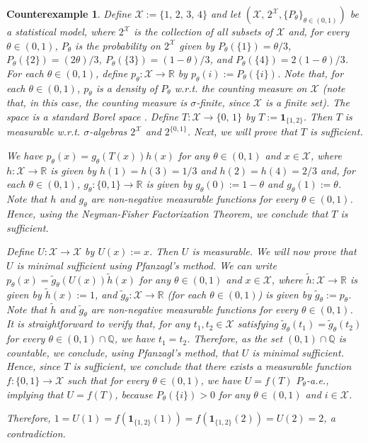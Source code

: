 \documentclass[12pt]{article}
\newtheorem{counterexample}{Counterexample}[section]
\begin{document}
\begin{counterexample}
\label{ex:3.2}
Define $\mathcal{X}:=\{1,\,2,\,3,\,4\}$ and let $(\mathcal{X},\,2^\mathcal{X},\{P_\theta\}_{\theta\in (0,1)})$ be a statistical model, where $2^\mathcal{X}$ is the collection of all subsets of $\mathcal{X}$ and, for every $\theta\in(0,1)$, $P_\theta$ is the probability on $2^\mathcal{X}$ given by $P_\theta (\{1\})=\theta /3$, $P_\theta (\{2\})=(2\theta )/3$, $P_\theta (\{3\})=(1-\theta )/3$, and $P_\theta (\{4\})=2(1-\theta )/3$. For each $\theta\in(0,1)$, define $p_\theta:\mathcal{X}\to \mathbb{R}$ by $p_\theta (i):=P_\theta (\{i\})$. Note that, for each $\theta\in(0,1)$, $p_\theta$ is a density of $P_\theta$ w.r.t. the counting measure on $\mathcal{X}$ (note that, in this case, the counting measure is $\sigma$-finite, since $\mathcal{X}$ is a finite set). The space is a standard Borel space \citep[see the first example of Section 2.2 of][]{Srivastava1998}. Define $T:\mathcal{X}\to \{0,\,1\}$ by $T:=\mathbf{1}_{\{1,2\}}$. Then $T$ is measurable w.r.t. $\sigma$-algebras $2^\mathcal{X}$ and $2^{\{0,1\}}$. Next, we will prove that $T$ is sufficient.

We have $p_\theta (x)=g_{\theta}(T(x))h(x)$ for any $\theta\in(0,1)$ and $x\in \mathcal{X}$, where $h:\mathcal{X}\to \mathbb{R}$ is given by $h(1)=h(3)=1/3$ and $h(2)=h(4)=2/3$ and, for each $\theta\in(0,1)$, $g_\theta :\{0,1\}\to \mathbb{R}$ is given by $g_\theta (0):=1-\theta $ and $g_\theta (1):=\theta $. Note that $h$ and $g_\theta$ are non-negative measurable functions for every $\theta\in (0,1)$. Hence, using the Neyman-Fisher Factorization Theorem, we conclude that $T$ is sufficient.

Define $U:\mathcal{X}\to \mathcal{X}$ by $U(x):=x$. Then $U$ is measurable. We will now prove that $U$ is minimal sufficient using Pfanzagl's method. We can write $p_\theta (x)=\tilde g_{\theta}(U(x))\tilde h(x)$ for any $\theta\in (0,1)$ and $x\in \mathcal{X}$, where $\tilde h:\mathcal{X}\to \mathbb{R}$ is given by $\tilde h(x):=1$, and $\tilde g_\theta :\mathcal{X}\to \mathbb{R}$ (for each $\theta\in (0,1)$) is given by $\tilde g_\theta := p_\theta $. Note that $\tilde h$ and $\tilde g_\theta$ are non-negative measurable functions for every $\theta\in(0,1)$. It is straightforward to verify that, for any $t_1,t_2\in \mathcal{X}$ satisfying $\tilde g_\theta (t_1)=\tilde g_\theta (t_2)$ for every $\theta\in (0,1)\cap \mathbb{Q}$, we have $t_1=t_2$. Therefore, as the set $(0,1)\cap \mathbb{Q}$ is countable, we conclude, using Pfanzagl's method, that $U$ is minimal sufficient. Hence, since $T$ is sufficient, we conclude that there exists a measurable function $f:\{0,1\}\to \mathcal{X}$ such that for every $\theta\in (0,1)$, we have $U=f(T)$ $P_\theta$-a.e., implying that $U=f(T)$, because $P_\theta (\{i\})>0$ for any $\theta\in (0,1)$ and $i\in \mathcal{X}$.

Therefore, $1=U(1)=f(\mathbf{1}_{\{1,2\}}(1))=f(\mathbf{1}_{\{1,2\}}(2))=U(2)=2$, a contradiction.
\end{counterexample}
\end{document}
